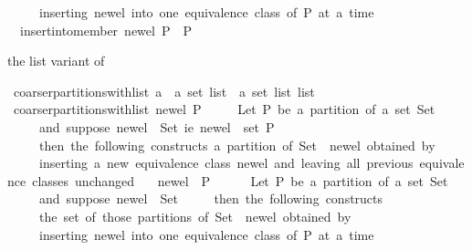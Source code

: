 \begin{isabellebody}
\ \ \ \ \ inserting\ new{\isacharunderscore}el\ into\ one\ equivalence\ class\ of\ P\ at\ a\ time{\isachardot}\ {\isacharasterisk}{\isacharparenright}\isanewline
\ \ {\isacharparenleft}{\isacharparenleft}insert{\isacharunderscore}into{\isacharunderscore}member\ new{\isacharunderscore}el\ P{\isacharparenright}\ {\isacharbackquote}\ P{\isacharparenright}{\isachardoublequoteclose}%
\begin{isamarkuptext}%
the list variant of %
\end{isamarkuptext}%
\isamarkuptrue%
\isamarkupfalse%
\ coarser{\isacharunderscore}partitions{\isacharunderscore}with{\isacharunderscore}list\ {\isacharcolon}{\isacharcolon}{\isachardoublequoteopen}{\isacharprime}a\ {\isasymRightarrow}\ {\isacharprime}a\ set\ list\ {\isasymRightarrow}\ {\isacharprime}a\ set\ list\ list{\isachardoublequoteclose}\isanewline
{}\ {\isachardoublequoteopen}coarser{\isacharunderscore}partitions{\isacharunderscore}with{\isacharunderscore}list\ new{\isacharunderscore}el\ P\ {\isacharequal}\ \isanewline
\ \ {\isacharparenleft}{\isacharasterisk}\ Let\ P\ be\ a\ partition\ of\ a\ set\ Set{\isacharcomma}\isanewline
\ \ \ \ \ and\ suppose\ new{\isacharunderscore}el\ {\isasymnotin}\ Set{\isacharcomma}\ i{\isachardot}e{\isachardot}\ {\isacharbraceleft}new{\isacharunderscore}el{\isacharbraceright}\ {\isasymnotin}\ set\ P{\isacharcomma}\isanewline
\ \ \ \ \ then\ the\ following\ constructs\ a\ partition\ of\ {\isacharprime}Set\ {\isasymunion}\ {\isacharbraceleft}new{\isacharunderscore}el{\isacharbraceright}{\isacharprime}\ obtained\ by\isanewline
\ \ \ \ \ inserting\ a\ new\ equivalence\ class\ {\isacharbraceleft}new{\isacharunderscore}el{\isacharbraceright}\ and\ leaving\ all\ previous\ equivalence\ classes\ unchanged{\isachardot}\ {\isacharasterisk}{\isacharparenright}\isanewline
\ \ {\isacharparenleft}{\isacharbraceleft}new{\isacharunderscore}el{\isacharbraceright}\ {\isacharhash}\ P{\isacharparenright}\isanewline
\ \ {\isacharhash}\isanewline
\ \ {\isacharparenleft}{\isacharasterisk}\ Let\ P\ be\ a\ partition\ of\ a\ set\ Set{\isacharcomma}\isanewline
\ \ \ \ \ and\ suppose\ new{\isacharunderscore}el\ {\isasymnotin}\ Set{\isacharcomma}\isanewline
\ \ \ \ \ then\ the\ following\ constructs\isanewline
\ \ \ \ \ the\ set\ of\ those\ partitions\ of\ {\isacharprime}Set\ {\isasymunion}\ {\isacharbraceleft}new{\isacharunderscore}el{\isacharbraceright}{\isacharprime}\ obtained\ by\isanewline
\ \ \ \ \ inserting\ new{\isacharunderscore}el\ into\ one\ equivalence\ class\ of\ P\ at\ a\ time{\isachardot}\ {\isacharasterisk}{\isacharparenright}\isanewline

\end{isabellebody}
